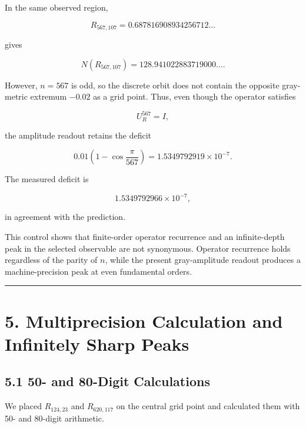 \documentclass[
  10pt,
  a4paper,
]{article}
\begin{document}
In the same observed region,

\[
R_{567,107}
=0.687816908934256712\ldots
\]

gives

\[
N(R_{567,107})
=128.941022883719000\ldots.
\]

However, \(n=567\) is odd, so the discrete orbit does not contain the
opposite gray-metric extremum \(-0.02\) as a grid point. Thus, even
though the operator satisfies

\[
U_R^{567}=I,
\]

the amplitude readout retains the deficit

\[
0.01\left(1-\cos\frac{\pi}{567}\right)
=1.5349792919\times10^{-7}.
\]

The measured deficit is

\[
1.5349792966\times10^{-7},
\]

in agreement with the prediction.

This control shows that finite-order operator recurrence and an
infinite-depth peak in the selected observable are not synonymous.
Operator recurrence holds regardless of the parity of \(n\), while the
present gray-amplitude readout produces a machine-precision peak at even
fundamental orders.

\begin{center}\rule{0.5\linewidth}{0.5pt}\end{center}

\section{5. Multiprecision Calculation and Infinitely Sharp
Peaks}\label{multiprecision-calculation-and-infinitely-sharp-peaks}

\subsection{5.1 50- and 80-Digit
Calculations}\label{and-80-digit-calculations}

We placed \(R_{124,23}\) and \(R_{620,117}\) on the central grid point
and calculated them with 50- and 80-digit arithmetic.
\end{document}
